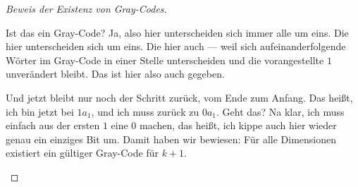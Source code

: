 \begin{proof}[Beweis der Existenz von Gray-Codes]
\begin{spoken-clean}[00:50:58 - 00:52:40]
Ist das ein Gray-Code? Ja, also hier unterscheiden sich immer alle um eins. Die hier unterscheiden sich um eins. Die hier auch --- weil sich aufeinanderfolgende Wörter im Gray-Code in einer Stelle unterscheiden und die vorangestellte $1$ unverändert bleibt. Das ist hier also auch gegeben.

Und jetzt bleibt nur noch der Schritt zurück, vom Ende zum Anfang. Das heißt, ich bin jetzt bei $1a_1$, und ich muss zurück zu $0a_1$. Geht das? Na klar, ich muss einfach aus der ersten $1$ eine $0$ machen, das heißt, ich kippe auch hier wieder genau ein einziges Bit um. Damit haben wir bewiesen: Für alle Dimensionen existiert ein gültiger Gray-Code für $k+1$. 
\end{spoken-clean}


\end{proof}
